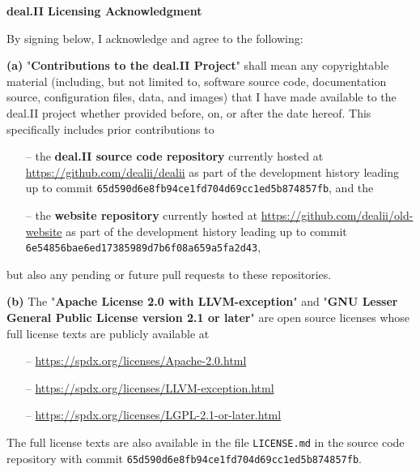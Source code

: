 \documentclass[oneside, 12pt, letterpaper]{article}
\begin{document}
\thispagestyle{empty}
\enlargethispage{3em}

\begin{center}
  {\bfseries deal.II Licensing Acknowledgment}
\end{center}

By signing below, I acknowledge and agree to the following:

{\bfseries (a)} "{\bfseries Contributions to the deal.II Project}" shall
mean any copyrightable material (including, but not limited to, software
source code, documentation source, configuration files, data, and images)
that I have made available to the deal.II project whether provided before,
on, or after the date hereof. This specifically includes prior
contributions to
\vspace{-0.5em}
\begin{itemize}[noitemsep]
  \item[--]
    the {\bfseries deal.II source code repository} currently hosted at
    \url{https://github.com/dealii/dealii} as part of the development
    history leading up to commit
    \texttt{65d590d6e8fb94ce1fd704d69cc1ed5b874857fb}, and the
  \item[--]
    the {\bfseries website repository} currently hosted at
    \url{https://github.com/dealii/old-website} as part of the development
    history leading up to commit
    \texttt{6e54856bae6ed17385989d7b6f08a659a5fa2d43},
\end{itemize}
\vspace{-0.5em}
but also any pending or future pull requests to these repositories.

{\bfseries (b)} The "{\bfseries Apache License 2.0 with LLVM-exception}"
and "{\bfseries GNU Lesser General Public License version 2.1 or later}"
are open source licenses whose full license texts are publicly available at
\vspace{-0.5em}
\begin{itemize}[noitemsep]
  \item[--] \url{https://spdx.org/licenses/Apache-2.0.html}
  \item[--] \url{https://spdx.org/licenses/LLVM-exception.html}
  \item[--] \url{https://spdx.org/licenses/LGPL-2.1-or-later.html}
\end{itemize}
\vspace{-0.5em}
The full license texts are also available in the file \texttt{LICENSE.md}
in the source code repository with commit
\texttt{65d590d6e8fb94ce1fd704d69cc1ed5b874857fb}.
\end{document}

